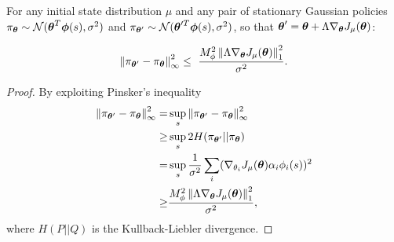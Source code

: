 \begin{lemma}\label{aux:2}
For any initial state distribution $\mu$ and any pair of stationary Gaussian policies $\pi_{\vtheta} \sim \mathcal{N}(\vtheta^T\boldsymbol{\phi}(s),\sigma^2)$ and $\pi_{\vtheta'} \sim \mathcal{N}(\vtheta'^T\boldsymbol{\phi}(s),\sigma^2)$, so that $\vtheta'=\vtheta+\Lambda\gradJ{\vtheta}$:

\[ \norm[\infty]{\pi_{\vtheta'}-\pi_{\vtheta}}^2 \leq \
	\frac{M_{\phi}^2\norm[1]{\Lambda\gradJ{\vtheta}}^2}{\sigma^2}.
\]
\end{lemma}

\begin{proof}
By exploiting Pinsker's inequality \cite{Pinsker1960}
\begin{align*}
\norm[\infty]{\pi_{\vtheta'}-\pi_{\vtheta}}^2 = & \sup\limits_s \norm[\infty]{\pi_{\vtheta'}-\pi_{\vtheta}}^2 \\
	\geq & \sup\limits_s 2H(\pi_{\vtheta'}||\pi_{\vtheta}) \\
	= & \sup\limits_s \frac{1}{\sigma^2} \sum\limits_i 
	(\gradJ{\theta_i}\alpha_i\phi_i(s))^2 \\
	\geq & \frac{M_{\phi}^2\norm[1]{\Lambda\gradJ{\vtheta}}^2}{\sigma^2},
\end{align*}
where $H(P||Q)$ is the Kullback-Liebler divergence.
\end{proof}


